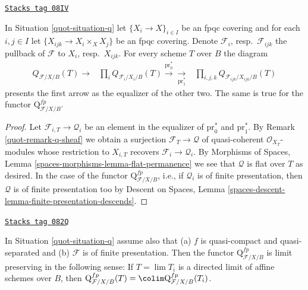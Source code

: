 \begin{lemma}[Q sheaf in X]
\label{quot-lemma-q-sheaf-in-X}
\href{https://stacks.math.columbia.edu/tag/08IV}{\texttt{Stacks tag 08IV}}

In Situation \ref{quot-situation-q} let $\{X_i \to X\}_{i \in I}$ be an fpqc
covering and for each $i, j \in I$ let $\{X_{ijk} \to X_i \times_X X_j\}$
be an fpqc covering. Denote $\mathcal{F}_i$, resp.\ $\mathcal{F}_{ijk}$
the pullback of $\mathcal{F}$ to $X_i$, resp.\ $X_{ijk}$. For every scheme
$T$ over $B$ the diagram
$$
\begin{array}{ccc}Q_{\mathcal{F}/X/B}(T) \longrightarrow & \prod\nolimits_i
Q_{\mathcal{F}_i/X_i/B}(T)
\overset{\text{pr}_0^*}{\longrightarrow}\underset{\text{pr}_1^*}{\longrightarrow} & \prod\nolimits_{i, j, k}
Q_{\mathcal{F}_{ijk}/X_{ijk}/B}(T)\end{array}
$$
presents the first arrow as the equalizer of the other two.
The same is true for the functor $\text{Q}^{fp}_{\mathcal{F}/X/B}$.
\end{lemma}

\begin{proof}

Let $\mathcal{F}_{i, T} \to \mathcal{Q}_i$ be an element in the equalizer
of $\text{pr}_0^*$ and $\text{pr}_1^*$. By Remark \ref{quot-remark-q-sheaf}
we obtain a surjection $\mathcal{F}_T \to \mathcal{Q}$ of quasi-coherent
$\mathcal{O}_{X_T}$-modules whose restriction to $X_{i, T}$ recovers
$\mathcal{F}_i \to \mathcal{Q}_i$.
By Morphisms of Spaces, Lemma \ref{spaces-morphisms-lemma-flat-permanence}
we see that $\mathcal{Q}$ is flat over $T$ as desired.
In the case of the functor $\text{Q}^{fp}_{\mathcal{F}/X/B}$, i.e.,
if $\mathcal{Q}_i$ is of finite presentation, then
$\mathcal{Q}$ is of finite presentation too by
Descent on Spaces, Lemma
\ref{spaces-descent-lemma-finite-presentation-descends}.
\end{proof}

\begin{lemma}
\label{quot-lemma-q-limit-preserving}
\href{https://stacks.math.columbia.edu/tag/082Q}{\texttt{Stacks tag 082Q}}

In Situation \ref{quot-situation-q} assume also that
(a) $f$ is quasi-compact and quasi-separated and
(b) $\mathcal{F}$ is of finite presentation.
Then the functor $\text{Q}^{fp}_{\mathcal{F}/X/B}$
is limit preserving in the following sense: If $T = \lim T_i$ is a
directed limit of affine schemes over $B$, then
$\text{Q}^{fp}_{\mathcal{F}/X/B}(T) =
\colim \text{Q}^{fp}_{\mathcal{F}/X/B}(T_i)$.
\end{lemma}

